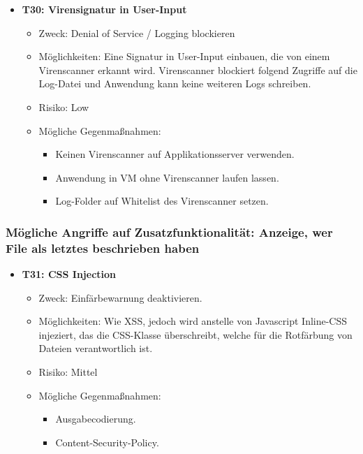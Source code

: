 \documentclass[12pt,DIV14,BCOR10mm,a4paper,parskip=half-,headsepline,headinclude,english,ngerman,bibliography=totocnumbered]{scrreprt}
\begin{document}
\begin{itemize}
  \hypertarget{threat30}{}
  \item \textbf{T30: Virensignatur in User-Input}
  \begin{itemize}
  \item Zweck: Denial of Service / Logging blockieren
  \item Möglichkeiten: Eine Signatur in User-Input einbauen, die von einem Virenscanner erkannt wird. Virenscanner blockiert folgend Zugriffe auf die Log-Datei und Anwendung kann keine weiteren Logs schreiben.
  \item Risiko: Low
  \item Mögliche Gegenmaßnahmen:
  \begin{itemize}
  	\item Keinen Virenscanner auf Applikationsserver verwenden.
  	\item Anwendung in VM ohne Virenscanner laufen lassen.
  	\item Log-Folder auf Whitelist des Virenscanner setzen.
  \end{itemize}
  \end{itemize}
\end{itemize}

\subsubsection{Mögliche Angriffe auf Zusatzfunktionalität: Anzeige, wer File als letztes beschrieben haben}

\begin{itemize}

  \hypertarget{threat31}{}
  \item \textbf{T31: CSS Injection}
  \begin{itemize}
  \item Zweck: Einfärbewarnung deaktivieren.
  \item Möglichkeiten: Wie XSS, jedoch wird anstelle von Javascript Inline-CSS injeziert, das die CSS-Klasse überschreibt, welche für die Rotfärbung von Dateien verantwortlich ist.
  \item Risiko: Mittel
  \item Mögliche Gegenmaßnahmen:
  \begin{itemize}
	  \item Ausgabecodierung.
	  \item Content-Security-Policy.
  \end{itemize}
\end{itemize}
\end{itemize}
\end{document}
